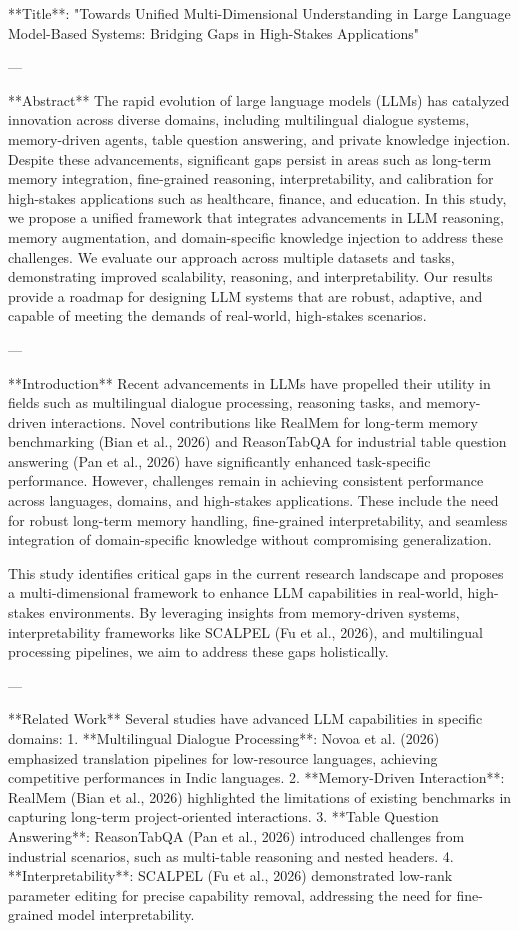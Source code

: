 **Title**: "Towards Unified Multi-Dimensional Understanding in Large Language Model-Based Systems: Bridging Gaps in High-Stakes Applications"

---

**Abstract**  
The rapid evolution of large language models (LLMs) has catalyzed innovation across diverse domains, including multilingual dialogue systems, memory-driven agents, table question answering, and private knowledge injection. Despite these advancements, significant gaps persist in areas such as long-term memory integration, fine-grained reasoning, interpretability, and calibration for high-stakes applications such as healthcare, finance, and education. In this study, we propose a unified framework that integrates advancements in LLM reasoning, memory augmentation, and domain-specific knowledge injection to address these challenges. We evaluate our approach across multiple datasets and tasks, demonstrating improved scalability, reasoning, and interpretability. Our results provide a roadmap for designing LLM systems that are robust, adaptive, and capable of meeting the demands of real-world, high-stakes scenarios.

---

**Introduction**  
Recent advancements in LLMs have propelled their utility in fields such as multilingual dialogue processing, reasoning tasks, and memory-driven interactions. Novel contributions like RealMem for long-term memory benchmarking (Bian et al., 2026) and ReasonTabQA for industrial table question answering (Pan et al., 2026) have significantly enhanced task-specific performance. However, challenges remain in achieving consistent performance across languages, domains, and high-stakes applications. These include the need for robust long-term memory handling, fine-grained interpretability, and seamless integration of domain-specific knowledge without compromising generalization.

This study identifies critical gaps in the current research landscape and proposes a multi-dimensional framework to enhance LLM capabilities in real-world, high-stakes environments. By leveraging insights from memory-driven systems, interpretability frameworks like SCALPEL (Fu et al., 2026), and multilingual processing pipelines, we aim to address these gaps holistically.

---

**Related Work**  
Several studies have advanced LLM capabilities in specific domains:  
1. **Multilingual Dialogue Processing**: Novoa et al. (2026) emphasized translation pipelines for low-resource languages, achieving competitive performances in Indic languages.
2. **Memory-Driven Interaction**: RealMem (Bian et al., 2026) highlighted the limitations of existing benchmarks in capturing long-term project-oriented interactions.
3. **Table Question Answering**: ReasonTabQA (Pan et al., 2026) introduced challenges from industrial scenarios, such as multi-table reasoning and nested headers.
4. **Interpretability**: SCALPEL (Fu et al., 2026) demonstrated low-rank parameter editing for precise capability removal, addressing the need for fine-grained model interpretability.

